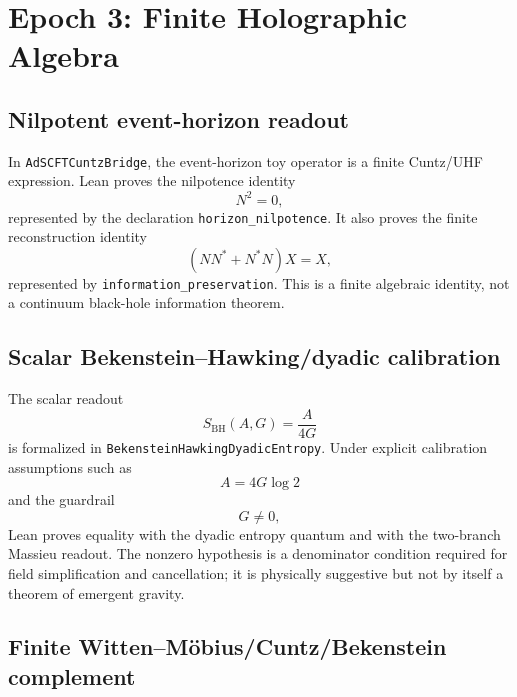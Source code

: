 \documentclass[11pt,a4paper]{article}
\begin{document}
\section{Epoch 3: Finite Holographic Algebra}

\subsection{Nilpotent event-horizon readout}

In \texttt{AdSCFTCuntzBridge}, the event-horizon toy operator is a finite
Cuntz/UHF expression.  Lean proves the nilpotence identity
\begin{equation}
  N^2 = 0,
\end{equation}
represented by the declaration \texttt{horizon\_nilpotence}.  It also proves the
finite reconstruction identity
\begin{equation}
  (N N^* + N^* N) X = X,
\end{equation}
represented by \texttt{information\_preservation}.  This is a finite algebraic
identity, not a continuum black-hole information theorem.

\subsection{Scalar Bekenstein--Hawking/dyadic calibration}

The scalar readout
\begin{equation}
  S_{\mathrm{BH}}(A,G) = \frac{A}{4G}
\end{equation}
is formalized in \texttt{BekensteinHawkingDyadicEntropy}.  Under explicit
calibration assumptions such as
\begin{equation}
  A = 4G \log 2
\end{equation}
and the guardrail
\begin{equation}
  G \ne 0,
\end{equation}
Lean proves equality with the dyadic entropy quantum and with the two-branch
Massieu readout.  The nonzero hypothesis is a denominator condition required for
field simplification and cancellation; it is physically suggestive but not by
itself a theorem of emergent gravity.

\subsection{Finite Witten--Möbius/Cuntz/Bekenstein complement}
\end{document}
